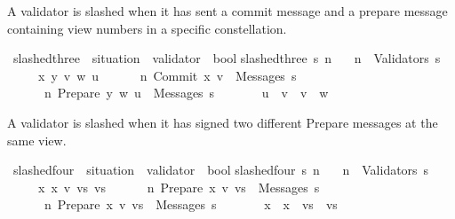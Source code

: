 \documentclass{beamer}
\begin{document}
\begin{frame}
\begin{isamarkuptext}%
[iii] A validator is slashed when it has sent a commit message and a prepare message
     containing view numbers in a specific constellation.%
\end{isamarkuptext}\isamarkuptrue%
\isamarkupfalse%
\ slashed{\isacharunderscore}three\ {\isacharcolon}{\isacharcolon}\ {\isachardoublequoteopen}situation\ {\isasymRightarrow}\ validator\ {\isasymRightarrow}\ bool{\isachardoublequoteclose}\isanewline
{}\isanewline
{\isachardoublequoteopen}slashed{\isacharunderscore}three\ s\ n\ {\isacharequal}\isanewline
\ \ {\isacharparenleft}n\ {\isasymin}\ Validators\ s\ {\isasymand}\isanewline
\ \ \ \ {\isacharparenleft}{\isasymexists}\ x\ y\ v\ w\ u{\isachardot}\isanewline
\ \ \ \ \ \ {\isacharparenleft}n{\isacharcomma}\ Commit\ {\isacharparenleft}x{\isacharcomma}\ v{\isacharparenright}{\isacharparenright}\ {\isasymin}\ Messages\ s\ {\isasymand}\isanewline
\ \ \ \ \ \ {\isacharparenleft}n{\isacharcomma}\ Prepare\ {\isacharparenleft}y{\isacharcomma}\ w{\isacharcomma}\ u{\isacharparenright}{\isacharparenright}\ {\isasymin}\ Messages\ s\ {\isasymand}\isanewline
\ \ \ \ \ \ u\ {\isacharless}\ v\ {\isasymand}\ v\ {\isacharless}\ w{\isacharparenright}{\isacharparenright}{\isachardoublequoteclose}%
\end{frame}

\begin{frame}
\begin{isamarkuptext}%
[iv] A validator is slashed when it has signed two different Prepare messages at the same view.%
\end{isamarkuptext}\isamarkuptrue%
\isamarkupfalse%
\ slashed{\isacharunderscore}four\ {\isacharcolon}{\isacharcolon}\ {\isachardoublequoteopen}situation\ {\isasymRightarrow}\ validator\ {\isasymRightarrow}\ bool{\isachardoublequoteclose}\isanewline
{}\isanewline
{\isachardoublequoteopen}slashed{\isacharunderscore}four\ s\ n\ {\isacharequal}\isanewline
\ \ {\isacharparenleft}n\ {\isasymin}\ Validators\ s\ {\isasymand}\isanewline
\ \ \ \ {\isacharparenleft}{\isasymexists}\ x{}\ x{}\ v\ vs{}\ vs{}{\isachardot}\isanewline
\ \ \ \ \ \ {\isacharparenleft}n{\isacharcomma}\ Prepare\ {\isacharparenleft}x{}{\isacharcomma}\ v{\isacharcomma}\ vs{}{\isacharparenright}{\isacharparenright}\ {\isasymin}\ Messages\ s\ {\isasymand}\isanewline
\ \ \ \ \ \ {\isacharparenleft}n{\isacharcomma}\ Prepare\ {\isacharparenleft}x{}{\isacharcomma}\ v{\isacharcomma}\ vs{}{\isacharparenright}{\isacharparenright}\ {\isasymin}\ Messages\ s\ {\isasymand}\isanewline
\ \ \ \ \ \ {\isacharparenleft}x{}\ {\isasymnoteq}\ x{}\ {\isasymor}\ vs{}\ {\isasymnoteq}\ vs{}{\isacharparenright}{\isacharparenright}{\isacharparenright}{\isachardoublequoteclose}%
\end{frame}
\end{document}
